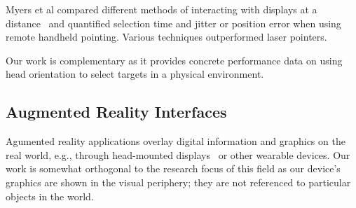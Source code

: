 Myers et al compared different methods of interacting with displays at a distance~\cite{myers_interacting_2002} and quantified selection time and jitter or position error when using remote handheld pointing. Various techniques outperformed laser pointers.

Our work is complementary as it provides concrete performance data on using head orientation to select targets in a physical environment.

\subsection{Augmented Reality Interfaces}
Agumented reality applications overlay digital information and graphics on the real world, e.g., through head-mounted displays~\cite{azuma_recent_2001} or other wearable devices. 
Our work is somewhat orthogonal to the research focus of this field as our device's graphics are shown in the visual periphery; they are not referenced to particular objects in the world.


